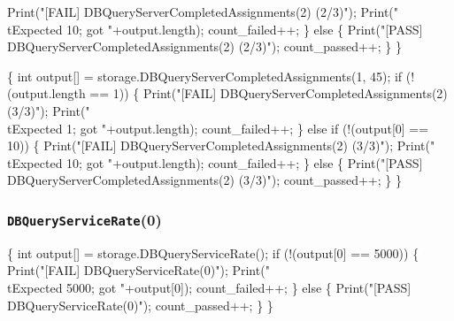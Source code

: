 \documentclass{article}
\def\nwendcode{\endtrivlist \endgroup}
\let\nwdocspar=\par
\begin{document}
    Print("[FAIL] DBQueryServerCompletedAssignments(2) (2/3)");
    Print("\\tExpected 10; got "+output.length);
    count_failed++;
  \} else \{
    Print("[PASS] DBQueryServerCompletedAssignments(2) (2/3)");
    count_passed++;
  \}
\}
\nwendcode{}\nwdocspar
\nwenddocs{}\endmoddef{}
\{
  int output[] = storage.DBQueryServerCompletedAssignments(1, 45);
  if (!(output.length == 1)) \{
    Print("[FAIL] DBQueryServerCompletedAssignments(2) (3/3)");
    Print("\\tExpected 1; got "+output.length);
    count_failed++;
  \} else if (!(output[0] == 10)) \{
    Print("[FAIL] DBQueryServerCompletedAssignments(2) (3/3)");
    Print("\\tExpected 10; got "+output.length);
    count_failed++;
  \} else \{
    Print("[PASS] DBQueryServerCompletedAssignments(2) (3/3)");
    count_passed++;
  \}
\}
\nwendcode{}\nwdocspar
\subsubsection{{\tt{}DBQueryServiceRate}(0)}
\nwenddocs{}\endmoddef{}
\{
  int output[] = storage.DBQueryServiceRate();
  if (!(output[0] == 5000)) \{
    Print("[FAIL] DBQueryServiceRate(0)");
    Print("\\tExpected 5000; got "+output[0]);
    count_failed++;
  \} else \{
    Print("[PASS] DBQueryServiceRate(0)");
    count_passed++;
  \}
\}
\nwendcode{}\nwdocspar
\end{document}
